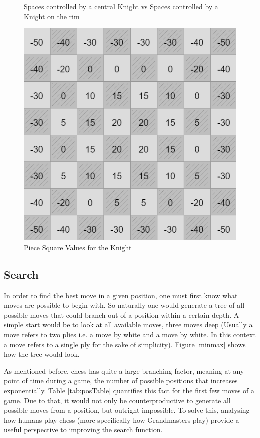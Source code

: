 \begin{figure}[H]
    \caption{Spaces controlled by a central Knight vs Spaces controlled by a Knight on the rim}
    \label{fig: knightPositions}
\end{figure}

\begin{figure}[H]
    \centering
    \includegraphics[scale=0.5]{images/KnightSquareValues.png}
    \caption{Piece Square Values for the Knight \cite{pieceSquares}}
    \label{fig:knightPieceSquareVals}
\end{figure}

\subsection{Search}

In order to find the best move in a given position, one must first know what moves are possible to begin with. So naturally one would generate a tree of all possible moves that could branch out of a position within a certain depth. A simple start would be to look at all available moves, three moves deep (Usually a move refers to two plies i.e. a move by white and a move by white. In this context a move refers to a single ply for the sake of simplicity). Figure \ref{minmax} shows how the tree would look.

As mentioned before, chess has quite a large branching factor, meaning at any point of time during a game, the number of possible positions that increases exponentially. Table \ref{tab:posTable} quantifies this fact for the first few moves of a game. Due to that, it would not only be counterproductive to generate all possible moves from a position, but outright impossible. To solve this, analysing how humans play chess (more specifically how Grandmasters play) provide a useful perspective to improving the search function.

